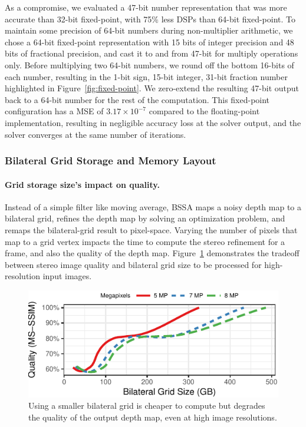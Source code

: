 As a compromise, we evaluated a 47-bit number representation that was more accurate than 32-bit fixed-point, with 75\% less DSPs than 64-bit fixed-point.
To maintain some precision of 64-bit numbers during non-multiplier arithmetic, we chose a 64-bit fixed-point representation with 15 bits of integer precision and 48 bits of fractional precision, and cast it to and from 47-bit for multiply operations only.
Before multiplying two 64-bit numbers, we round off the bottom 16-bits of each number, resulting in the 1-bit sign, 15-bit integer, 31-bit fraction number highlighted in Figure~\ref{fig:fixed-point}.
We zero-extend the resulting 47-bit output back to a 64-bit number for the rest of the computation. 
This fixed-point configuration has a MSE of $3.17\times10^{-7}$ compared to the floating-point implementation, resulting in negligible accuracy loss at the solver output, and the solver converges at the same number of iterations. 


\subsubsection{Bilateral Grid Storage and Memory Layout} 

\paragraph{Grid storage size's impact on quality.} Instead of a simple filter like moving average, BSSA maps a noisy depth map to a bilateral grid, refines the depth map by solving an optimization problem, and remaps the bilateral-grid result to pixel-space. Varying the number of pixels that map to a grid vertex impacts the time to compute the stereo refinement for a frame, and also the quality of the depth map. Figure~\ref{fig:vr-res-qual} demonstrates the tradeoff between stereo image quality and bilateral grid size to be processed for high-resolution input images. 

\begin{figure}[h]
\centering
    \begin{center}
\includegraphics[width=.45\textwidth]{nsp-figs/vr_res_qual.pdf}
    \end{center}
    \caption{Using a smaller bilateral grid is cheaper to compute but degrades the quality of the output depth map, even at high image resolutions. }
    \label{fig:vr-res-qual}
\end{figure}

